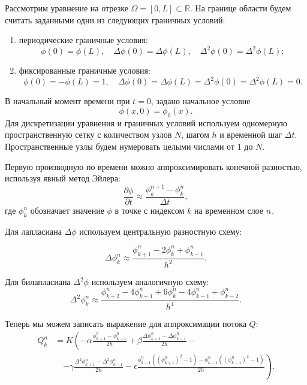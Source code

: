 

Рассмотрим уравнение на отрезке $\Omega = [0, L] \subset \mathbb{R}$. На границе области будем считать заданными одни из следующих граничных условий:
\begin{enumerate}
    \item периодические граничные условия:
    \begin{equation*}
        \phi(0) = \phi(L), \quad \Delta \phi(0) = \Delta \phi(L), \quad \Delta^2 \phi(0) = \Delta^2 \phi(L);
    \end{equation*}
    \item фиксированные граничные условия:
    \begin{equation*}
        \phi(0) = - \phi(L) = 1, \quad \Delta \phi(0) = \Delta \phi(L) = \Delta^2 \phi(0) = \Delta^2 \phi(L) = 0.
    \end{equation*}
\end{enumerate}
В начальный момент времени при $t = 0$, задано начальное условие 
\begin{equation*}
    \phi(x, 0) = \phi_0(x).
\end{equation*}
Для дискретизации уравнения и граничных условий используем одномерную пространственную сетку с количеством узлов \(N\), шагом \(h\) и временной шаг \( \Delta t \). Пространственные узлы будем нумеровать целыми числами от \(1\) до \(N\).

Первую производную по времени можно аппроксимировать конечной разностью, используя явный метод Эйлера:
\begin{equation*}
    \frac{\partial \phi}{\partial t} \approx \frac{\phi^{n+1}_k - \phi^n_k}{\Delta t},
\end{equation*}
где \( \phi^n_k \) обозначает значение \( \phi \) в точке с индексом \( k \) на временном слое \( n \).

Для лапласиана \( \Delta \phi \) используем центральную разностную схему:

\begin{equation*}
    \Delta \phi_k^n \approx \frac{\phi_{k+1}^n - 2\phi_k^n + \phi_{k-1}^n}{h^2}.
\end{equation*}

Для билапласиана \( \Delta^2 \phi \) используем аналогичную схему:
\begin{equation*}
    \Delta^2 \phi_k^n \approx \frac{\phi_{k+2}^n - 4\phi_{k+1}^n + 6\phi_k^n - 4\phi_{k-1}^n + \phi_{k-2}^n}{h^4}.
\end{equation*}


Теперь мы можем записать выражение для аппроксимации потока \( Q \):
\begin{align*}
    Q_k^n &= K \left(- \alpha \frac{\phi_{k+1}^n - \phi_{k-1}^n}{2h} + \beta \frac{\Delta \phi_{k+1}^n - \Delta \phi_{k-1}^n}{2h} - \right. \\
    &\quad \left. - \gamma \frac{\Delta^2 \phi_{k+1}^n - \Delta^2 \phi_{k-1}^n}{2h} - \epsilon \frac{\phi^{n}_{k+1} \left(  (\phi^{n}_{k+1})^2 - 1 \right) - \phi^{n}_{k-1} \left( (\phi^{n}_{k-1})^2 - 1 \right)}{2h} \right).
\end{align*}

